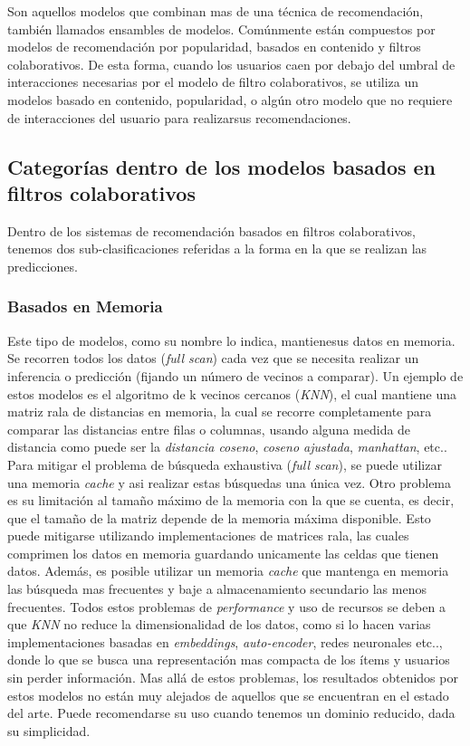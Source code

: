 \documentclass[11pt,a4paper,twoside]{thesis}
\begin{document}
Son aquellos modelos que combinan mas de una técnica de recomendación, también
llamados ensambles de modelos. Comúnmente están compuestos por modelos de
recomendación por popularidad, basados en contenido y filtros colaborativos. De
esta forma, cuando los usuarios caen por debajo del umbral de interacciones
necesarias por el modelo de filtro colaborativos, se utiliza un modelos basado
en contenido, popularidad, o algún otro modelo que no requiere de interacciones
del usuario para realizarsus recomendaciones.

\subsection{Categorías dentro de los modelos basados en filtros colaborativos}

Dentro de los sistemas de recomendación basados en filtros colaborativos,
tenemos dos sub-clasificaciones referidas a la forma en la que se realizan las
predicciones.

\subsubsection{Basados en Memoria}

Este tipo de modelos, como su nombre lo indica, mantienesus datos en memoria.
Se recorren todos los datos (\textit{full scan}) cada vez que se necesita
realizar un inferencia o predicción (fijando un número de vecinos a comparar).
Un ejemplo de estos modelos es el algoritmo de k vecinos cercanos
(\textit{KNN}), el cual mantiene una matriz rala de distancias en memoria, la
cual se recorre completamente para comparar las distancias entre filas o
columnas, usando alguna medida de distancia como puede ser la \textit{distancia
	coseno}, \textit{coseno ajustada}, \textit{manhattan}, etc.. Para mitigar el
problema de búsqueda exhaustiva (\textit{full scan}), se puede utilizar una
memoria \textit{cache} y asi realizar estas búsquedas una única vez. Otro
problema es su limitación al tamaño máximo de la memoria con la que se cuenta,
es decir, que el tamaño de la matriz depende de la memoria máxima disponible.
Esto puede mitigarse utilizando implementaciones de matrices rala, las cuales
comprimen los datos en memoria guardando unicamente las celdas que tienen
datos. Además, es posible utilizar un memoria \textit{cache} que mantenga en
memoria las búsqueda mas frecuentes y baje a almacenamiento secundario las
menos frecuentes. Todos estos problemas de \textit{performance} y uso de
recursos se deben a que \textit{KNN} no reduce la dimensionalidad de los datos,
como si lo hacen varias implementaciones basadas en \textit{embeddings},
\textit{auto-encoder}, redes neuronales etc.., donde lo que se busca una
representación mas compacta de los ítems y usuarios sin perder información. Mas
allá de estos problemas, los resultados obtenidos por estos modelos no están
muy alejados de aquellos que se encuentran en el estado del arte. Puede
recomendarse su uso cuando tenemos un dominio reducido, dada su simplicidad.
\end{document}
